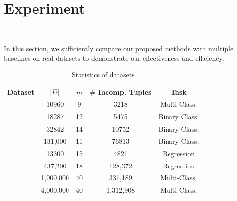 
\section{Experiment}~\label{sec:exp}


In this section, we sufficiently compare our proposed methods with multiple baselines on real datasets to demonstrate our effectiveness and efficiency. 

\begin{table}
	\centering
	\caption{Statistics of datasets}
	\vspace{-1em}
	{\small
	\begin{tabular}{ccccc}
		\hline
		{\bf Dataset} & {\bf $|D|$} & {\bf $m$} & {\bf $\#$ Incomp. Tuples} & {\bf Task}\\
		\hline	
		\nursery & 	10960 & 9 & 3218 & Multi-Class. \\
		\hr & 18287 & 12 & 5475 & Binary Class. \\
		\adult & 32842 & 14 & 10752 & Binary Class. \\
		\credit & 131,000 & 11 & 76813 & Binary Class. \\
		\bike & 13300 & 15 & 4821 & Regression \\
		\air & 437,200  & 18 & 128,372 & Regression\\
		\imdb & 1,000,000 & 40 & 331,189 & Multi-Class.\\
		\imdbl & 4,000,000 & 40 & 1,312,908 & Multi-Class.\\
		\hline
	\end{tabular}
	}
	\label{tbl:dataset}
\end{table}















